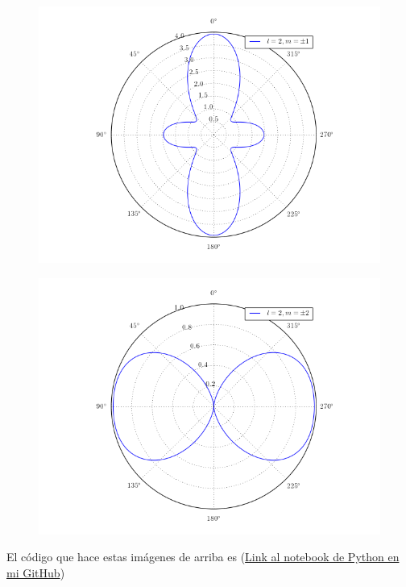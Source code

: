 \documentclass[a4paper,11pt]{article}
\numberwithin{equation}{section}
\begin{document}
\begin{figure}[H]
 \center
 \includegraphics[scale=0.6]{problema3fig5}
\end{figure}

\begin{figure}[H]
 \center
 \includegraphics[scale=0.6]{problema3fig6}
\end{figure}

El código que hace estas imágenes de arriba es (\href{google.com}{Link al 
notebook de Python en mi GitHub})
\end{document}

